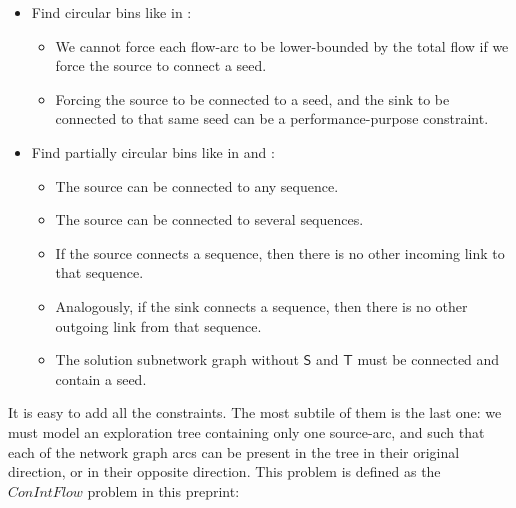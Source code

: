 \begin{itemize}
  \item Find circular bins like in :
    \begin{itemize}
      \item We cannot force each flow-arc to be lower-bounded by the total flow if we force the source to connect a seed.
      \item Forcing the source to be connected to a seed, and the sink to be connected to that same seed can be a performance-purpose constraint.
    \end{itemize}
  \item Find partially circular bins like in  and :
    \begin{itemize}
      \item The source can be connected to any sequence.
      \item The source can be connected to several sequences.
      \item If the source connects a sequence, then there is no other incoming link to that sequence.
      \item Analogously, if the sink connects a sequence, then there is no other outgoing link from that sequence.
      \item The solution subnetwork graph without \(\mathsf{S}\) and \(\mathsf{T}\) must be connected and contain a seed.
    \end{itemize}
\end{itemize}

It is easy to add all the constraints.
The most subtile of them is the last one: we must model an exploration tree containing only one source-arc, and such that each of the network graph arcs can be present in the tree in their original direction, or in their opposite direction.
This problem is defined as the \(ConIntFlow\) problem in this preprint:~\cite{CITECONNECTEDFLOWPREPRINT}